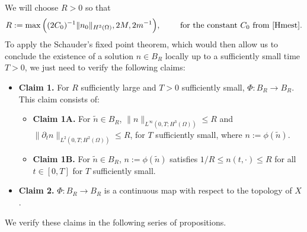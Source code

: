 \documentclass[12pt]{article}
\theoremstyle{plain}
\begin{document}
We will choose $R > 0$ so that
\begin{equation}\label{Rchoice}
R := \max\Big((2C_{0})^{-1}\|n_{0}\|_{H^{3}(\Omega)}, 2M, 2m^{-1}\Big), \qquad \text{ for the constant $C_{0}$ from \eqref{Hmest}}.
\end{equation}
To apply the Schauder's fixed point theorem, which would then allow us to conclude the existence of a solution $n \in B_{R}$ locally up to a sufficiently small time $T > 0$, we just need to verify the following claims:
\begin{itemize}
    \item \textbf{Claim 1.} For $R$ sufficiently large and $T > 0$ sufficiently small, $\Phi: B_{R} \to B_{R}$. This claim consists of:
    \begin{itemize}
        \item \textbf{Claim 1A.} For $\tilde{n} \in B_{R}$, $\|n\|_{L^{\infty}(0, T; H^{3}(\Omega))} \le R$ and $\|\partial_{t}n\|_{L^{2}(0, T; H^{2}(\Omega))} \le R$, for $T$ sufficiently small, where $n := \phi(\tilde{n})$. 
        \item \textbf{Claim 1B.} For $\tilde{n} \in B_{R}$, $n := \phi(\tilde{n})$ satisfies $1/R \le n(t, \cdot) \le R$ for all $t \in [0, T]$ for $T$ sufficiently small.
    \end{itemize}
    \item \textbf{Claim 2.} $\Phi: B_{R} \to B_{R}$ is a continuous map with respect to the topology of $X$.
\end{itemize}

\medskip

We verify these claims in the following series of propositions.
\end{document}
